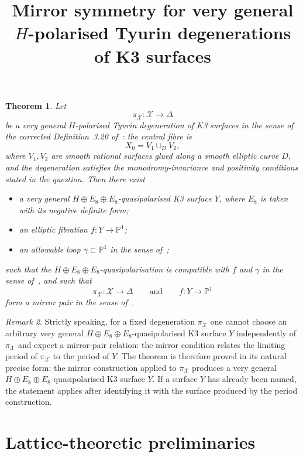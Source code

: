 \documentclass[11pt]{article}
\title{Mirror symmetry for very general \(H\)-polarised Tyurin degenerations of K3 surfaces}
\author{}
\date{}
\newtheorem{theorem}{Theorem}
\theoremstyle{remark}
\newtheorem{remark}[theorem]{Remark}
\numberwithin{equation}{section}
\begin{document}
\maketitle

\begin{theorem}\label{thm:main}
Let
\[
\pi_{\mathcal X}\colon \mathcal X\longrightarrow \Delta
\]
be a very general \(H\)-polarised Tyurin degeneration of K3 surfaces in the sense of the corrected Definition~3.20 of~\cite{dfk3slpms}: the central fibre is
\[
X_0=V_1\cup_D V_2,
\]
where \(V_1,V_2\) are smooth rational surfaces glued along a smooth elliptic curve \(D\), and the degeneration satisfies the monodromy-invariance and positivity conditions stated in the question. Then there exist
\begin{itemize}
  \item a very general \(H\oplus E_8\oplus E_8\)-quasipolarised K3 surface \(Y\), where \(E_8\) is taken with its negative definite form;
  \item an elliptic fibration \(f\colon Y\to \mathbb P^1\);
  \item an allowable loop \(\gamma\subset \mathbb P^1\) in the sense of~\cite[Definition~4.11]{dfk3slpms};
\end{itemize}
such that the \(H\oplus E_8\oplus E_8\)-quasipolarisation is compatible with \(f\) and \(\gamma\) in the sense of~\cite[Definition~4.21]{dfk3slpms}, and such that
\[
\pi_{\mathcal X}\colon \mathcal X\to \Delta
\qquad\text{and}\qquad
f\colon Y\to \mathbb P^1
\]
form a mirror pair in the sense of~\cite[Definition~5.1]{dfk3slpms}.
\end{theorem}

\begin{remark}\label{rem:quantifiers}
Strictly speaking, for a fixed degeneration \(\pi_{\mathcal X}\) one cannot choose an arbitrary very general \(H\oplus E_8\oplus E_8\)-quasipolarised K3 surface \(Y\) independently of \(\pi_{\mathcal X}\) and expect a mirror-pair relation: the mirror condition relates the limiting period of \(\pi_{\mathcal X}\) to the period of \(Y\). The theorem is therefore proved in its natural precise form: the mirror construction applied to \(\pi_{\mathcal X}\) produces a very general \(H\oplus E_8\oplus E_8\)-quasipolarised K3 surface \(Y\). If a surface \(Y\) has already been named, the statement applies after identifying it with the surface produced by the period construction.
\end{remark}

\section{Lattice-theoretic preliminaries}
\end{document}
